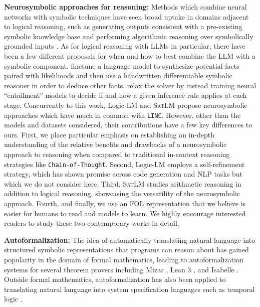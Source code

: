 \documentclass[11pt]{article}
\begin{document}
\textbf{Neurosymbolic approaches for reasoning:}
Methods which combine neural networks with symbolic techniques have seen broad uptake in domains adjacent to logical reasoning, such as generating outputs consistent with a pre-existing symbolic knowledge base \citep{marra2019integrating,manhaeve2018deepproblog,zhang2023tractable} and performing algorithmic reasoning over symbolically grounded inputs \citep{ebrahimi2021towards,ibarz2022generalist,velivckovic2022clrs}.
As for logical reasoning with LLMs in particular, there have been a few different proposals for when and how to best combine the LLM with a symbolic component.
\citet{zhang22improved} finetune a language model to synthesize potential facts paired with likelihoods and then use a handwritten differentiable symbolic reasoner in order to deduce other facts. 
\citet{weir2022dynamic} relax the solver by instead training neural ``entailment'' models to decide if and how a given inference rule applies at each stage. 
Concurrently to this work, Logic-LM \cite{pan2023logic} and \textsc{SatLM} \cite{ye2023satisfiability} propose neurosymbolic approaches which have much in common with \texttt{LINC}. However, other than the models and datasets considered, their contributions have a few key differences to ours. First, we place particular emphasis on establishing an in-depth understanding of the relative benefits and drawbacks of a neurosymbolic approach to reasoning when compared to traditional in-context reasoning strategies like \texttt{Chain-of-Thought}. Second, Logic-LM employs a self-refinement strategy, which has shown promise across code generation and NLP tasks
\cite{zhang2023self,chen2023teaching,peng2023check,madaan2023self,olausson2023selfrepair} but which we do not consider here. Third, \textsc{SatLM} studies arithmetic reasoning in addition to logical reasoning, showcasing the versatility of the neurosymbolic approach. Fourth, and finally, we use an FOL representation that we believe is easier for humans to read and models to learn. We highly encourage interested readers to study these two contemporary works in detail.

\textbf{Autoformalization:} The idea of automatically translating natural language into structured symbolic representations that programs can reason about has gained popularity in the domain of formal mathematics, leading to autoformalization systems for several theorem provers including Mizar \cite{wang2018first, wang2020exploration}, Lean 3 \cite{azerbayev2023proofnet}, and Isabelle \cite{wu2022autoformalization}. Outside formal mathematics, autoformalization has also been applied to translating natural language into system specification languages such as temporal logic \cite{hahn2022formal, cosler2023nl2spec, chen2023nl2tl}.
\end{document}
